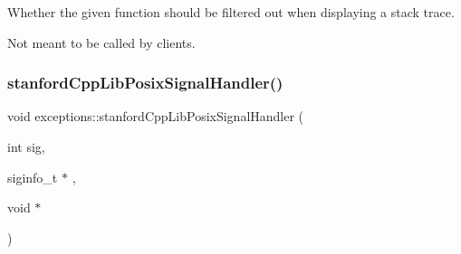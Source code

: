 Whether the given function should be filtered out when displaying a stack trace. 

Not meant to be called by clients. \mbox{\label{namespaceexceptions_af5fc12dcfd6bf28b568340210c9cc291}} 
\subsubsection{\texorpdfstring{stanford\+Cpp\+Lib\+Posix\+Signal\+Handler()}{stanfordCppLibPosixSignalHandler()}}
{\footnotesize\ttfamily void exceptions\+::stanford\+Cpp\+Lib\+Posix\+Signal\+Handler (\begin{DoxyParamCaption}\item[{int}]{sig,  }\item[{siginfo\+\_\+t $\ast$}]{,  }\item[{void $\ast$}]{ }\end{DoxyParamCaption})}

